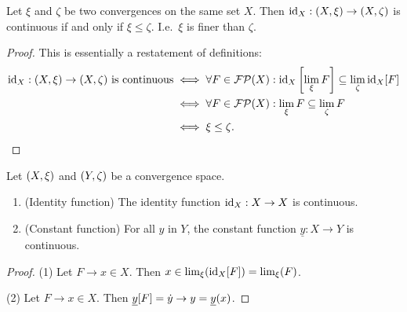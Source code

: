 \begin{lemma} \label{identityContinuity}
Let $\xi$ and $\zeta$ be two convergences on the same set $X$. Then $\operatorname{id}_X: \left( X,\xi \right) \to \left( X,\zeta \right)$ is continuous \textup{if and only if} $\xi \leq \zeta$. I.e.\ $\xi$ is finer than $\zeta$.
\end{lemma}
\begin{proof}
This is essentially a restatement of definitions:
\begin{align*}
\text{$\operatorname{id}_X: \left( X,\xi \right) \to \left( X,\zeta \right)$ is continuous} &\iff \forall F\in\operatorname{\mathcal{FP}}(X): \operatorname{id}_X\left[\lim_\xi F \right] \subseteq \lim_\zeta \operatorname{id}_X[F] \\
&\iff \forall F\in\operatorname{\mathcal{FP}}(X): \lim_\xi F \subseteq \lim_\zeta F \\
&\iff \xi \leq \zeta.
\end{align*}
\end{proof}

\begin{lemma} \label{continuityConstructions}
Let $\left( X,\xi \right)$ and $\left( Y,\zeta \right)$ be a convergence space.
\begin{enumerate}
\item \textup{(Identity function)} The identity function $\operatorname{id}_X:X\to X$ is continuous.
\item \textup{(Constant function)} For all $y$ in $Y$, the constant function $\underline{y}: X \to Y$ is continuous.
\end{enumerate}
\end{lemma}
\begin{proof}
(1) Let $F\to x \in X$. Then $x\in \lim_\xi(\operatorname{id}_X[F]) = \lim_\xi(F)$.

(2) Let $F\to x \in X$. Then $\underline{y}[F] = \dot{y} \to y = \underline{y}(x)$.
\end{proof}



